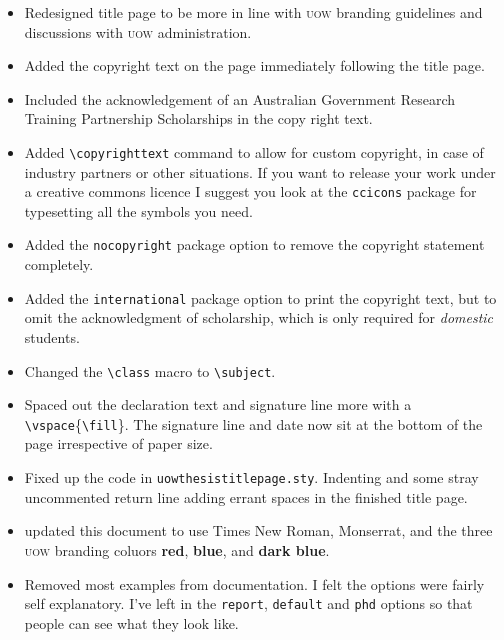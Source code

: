\documentclass[12pt,oneside]{article}
\newcommand{\option}[1]{\texttt{\color{UOWblue}#1}}
\newcommand{\command}[1]{\texttt{\color{UOWred}#1}}
\begin{document}
\begin{itemize}
  \item Redesigned title page to be more in line with \textsc{uow} branding guidelines and discussions with \textsc{uow} administration.
  \item Added the copyright text on the page immediately following the title page.
  \item Included the acknowledgement of an Australian Government Research Training Partnership Scholarships in the copy right text.
  \item Added \command{\textbackslash{}copyrighttext} command to allow for custom copyright, in case of industry partners or other situations. If you want to release your work under a creative commons licence I suggest you look at the \texttt{ccicons} package for typesetting all the symbols you need.
  \item Added the \option{nocopyright} package option to remove the copyright statement completely.
  \item Added the \option{international} package option to print the copyright text, but to omit the acknowledgment of scholarship, which is only required for \emph{domestic} students.
  \item Changed the \command{\textbackslash{}class} macro to \command{\textbackslash{}subject}.
  \item Spaced out the declaration text and signature line more with a \command{\textbackslash{}vspace}\{\command{\textbackslash{}fill}\}. The signature line and date now sit at the bottom of the page irrespective of paper size.
  \item Fixed up the code in \texttt{uowthesistitlepage.sty}. Indenting and some stray uncommented return line adding errant spaces in the finished title page.
  \item updated this document to use Times New Roman, \textsf{Monserrat}, and the three \textsc{uow} branding coluors \textcolor{UOWred}{\textbf{red}}, \textcolor{UOWblue}{\textbf{blue}}, and \textcolor{UOWdarkblue}{\textbf{dark blue}}.
  \item Removed most examples from documentation. I felt the options were fairly self explanatory. I've left in the \option{report}, \option{default} and \option{phd} options so that people can see what they look like.
\end{itemize}
\end{document}
